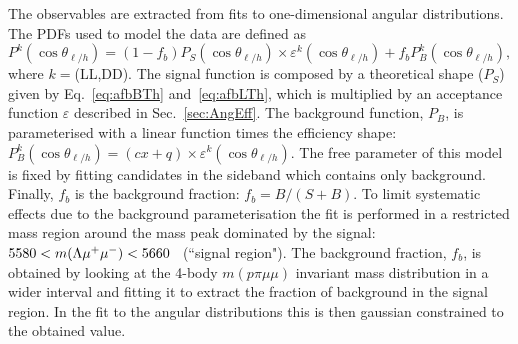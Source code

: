 The observables are extracted from fits to one-dimensional angular distributions.
%
%
The PDFs used to model the data are defined as
%
\begin{equation}
P^k(\cos\theta_{\ell/h}) = (1-f_b) P_S(\cos\theta_{\ell/h}) \times \varepsilon^k(\cos \theta_{\ell/h}) + 
		f_b P_B^k(\cos\theta_{\ell/h}),
\end{equation}
%
where $k=$(LL,DD). The signal function is composed by a theoretical shape ($P_S$) given by Eq.~\ref{eq:afbBTh}
and~\ref{eq:afbLTh}, which is multiplied by an acceptance function $\varepsilon$ described in Sec.~\ref{sec:AngEff}.
The background function, $P_B$, is parameterised with a linear function times the efficiency shape: 
$P_B^k(\cos\theta_{\ell/h}) = (cx+q) \times \varepsilon^k(\cos \theta_{\ell/h})$.
The free parameter of this model is fixed by fitting candidates in the sideband which contains only background. 
Finally, $f_b$ is the background fraction: $f_b = B/(S+B)$.
To limit systematic effects due to the background parameterisation
the fit is performed in a restricted mass region around the \Lb mass peak dominated by the signal:
$5580 < m(\Lambda\mu^+\mu^-) < 5660 $ \mevcc ~(``signal region").
%
The background fraction, $f_b$, is obtained by looking at the 4-body $m(p\pi\mu\mu)$ invariant mass
distribution in a wider interval and fitting it to extract the fraction of background in the signal region.
In the fit to the angular distributions this is then gaussian constrained to the obtained value.
